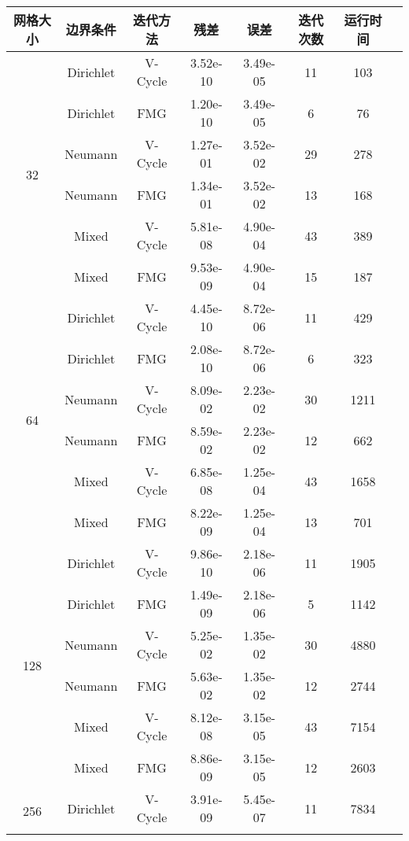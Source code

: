 \documentclass{ctexart}
\begin{document}
\begin{longtable}{cccccccc} \hline
	网格大小 & 边界条件 & 迭代方法 & 残差 & 误差 & 迭代次数 & 运行时间\\ \hline
	\multirow{6}{*}{32}		& Dirichlet	& V-Cycle	& 3.52e-10	& 3.49e-05	& 11	& 103		\\ \cline{2-7}
	\multirow{6}{*}{}		& Dirichlet	& FMG		& 1.20e-10	& 3.49e-05	& 6		& 76		\\ \cline{2-7}
	\multirow{6}{*}{}		& Neumann	& V-Cycle	& 1.27e-01	& 3.52e-02	& 29	& 278		\\ \cline{2-7}
	\multirow{6}{*}{}		& Neumann	& FMG		& 1.34e-01	& 3.52e-02	& 13	& 168		\\ \cline{2-7}
	\multirow{6}{*}{}		& Mixed		& V-Cycle	& 5.81e-08	& 4.90e-04	& 43	& 389		\\ \cline{2-7}
	\multirow{6}{*}{}		& Mixed		& FMG		& 9.53e-09	& 4.90e-04	& 15	& 187		\\ \hline
	\multirow{6}{*}{64}		& Dirichlet	& V-Cycle	& 4.45e-10	& 8.72e-06	& 11	& 429		\\ \cline{2-7}
	\multirow{6}{*}{}		& Dirichlet	& FMG		& 2.08e-10	& 8.72e-06	& 6		& 323		\\ \cline{2-7}
	\multirow{6}{*}{}		& Neumann	& V-Cycle	& 8.09e-02	& 2.23e-02	& 30	& 1211		\\ \cline{2-7}
	\multirow{6}{*}{}		& Neumann	& FMG		& 8.59e-02	& 2.23e-02	& 12	& 662		\\ \cline{2-7}
	\multirow{6}{*}{}		& Mixed		& V-Cycle	& 6.85e-08	& 1.25e-04	& 43	& 1658		\\ \cline{2-7}
	\multirow{6}{*}{}		& Mixed		& FMG		& 8.22e-09	& 1.25e-04	& 13	& 701		\\ \hline
	\multirow{6}{*}{128}	& Dirichlet	& V-Cycle	& 9.86e-10	& 2.18e-06	& 11	& 1905		\\ \cline{2-7}
	\multirow{6}{*}{}		& Dirichlet	& FMG		& 1.49e-09	& 2.18e-06	& 5		& 1142		\\ \cline{2-7}
	\multirow{6}{*}{}		& Neumann	& V-Cycle	& 5.25e-02	& 1.35e-02	& 30	& 4880		\\ \cline{2-7}
	\multirow{6}{*}{}		& Neumann	& FMG		& 5.63e-02	& 1.35e-02	& 12	& 2744		\\ \cline{2-7}
	\multirow{6}{*}{}		& Mixed		& V-Cycle	& 8.12e-08	& 3.15e-05	& 43	& 7154		\\ \cline{2-7}
	\multirow{6}{*}{}		& Mixed		& FMG		& 8.86e-09	& 3.15e-05	& 12	& 2603		\\ \hline
	\multirow{6}{*}{256}	& Dirichlet	& V-Cycle	& 3.91e-09	& 5.45e-07	& 11	& 7834		\\ \cline{2-7}

\end{longtable}
\end{document}
